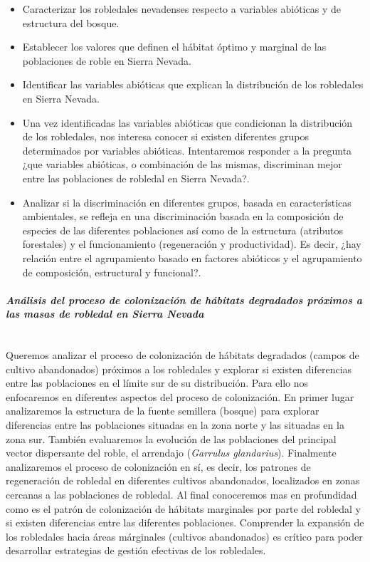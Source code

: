 \begin{itemize}
	\item Caracterizar los robledales nevadenses respecto a variables abióticas y de estructura del bosque.
	\item Establecer los valores que definen el hábitat óptimo y marginal de las poblaciones de roble en Sierra Nevada.
	\item Identificar las variables abióticas que explican la distribución de los robledales en Sierra Nevada.
	\item Una vez identificadas las variables abióticas que condicionan la distribución de los robledales, nos interesa conocer si existen diferentes grupos determinados por variables abióticas. Intentaremos responder a la pregunta ¿que variables abióticas, o combinación de las mismas, discriminan mejor entre las poblaciones de robledal en Sierra Nevada?.
	\item Analizar si la discriminación en diferentes grupos, basada en características ambientales, se refleja en una discriminación basada en la composición de especies de las diferentes poblaciones así como de la estructura (atributos forestales) y el funcionamiento (regeneración y productividad). Es decir, ¿hay relación entre el agrupamiento basado en factores abióticos y el agrupamiento de composición, estructural y funcional?. 
\end{itemize}

\paragraph{\emph{Análisis del proceso de colonización de hábitats degradados próximos a las masas de robledal en Sierra Nevada}}\mbox{} \\
Queremos analizar el proceso de colonización de hábitats degradados (campos de cultivo abandonados) próximos a los robledales y explorar si existen diferencias entre las poblaciones en el límite sur de su distribución. Para ello nos enfocaremos en diferentes aspectos del proceso de colonización. En primer lugar analizaremos la estructura de la fuente semillera (bosque) para explorar diferencias entre las poblaciones situadas en la zona norte y las situadas en la zona sur. También evaluaremos la evolución de las poblaciones del principal vector dispersante del roble, el arrendajo (\emph{Garrulus glandarius}). Finalmente analizaremos el proceso de colonización en sí, es decir, los patrones de regeneración de robledal en diferentes cultivos abandonados, localizados en zonas cercanas a las poblaciones de robledal.
Al final conoceremos mas en profundidad como es el patrón de colonización de hábitats marginales por parte del robledal y si existen diferencias entre las diferentes poblaciones. Comprender la expansión de los robledales hacia áreas márginales (cultivos abandonados) es crítico para poder desarrollar estrategias de gestión efectivas de los robledales.



